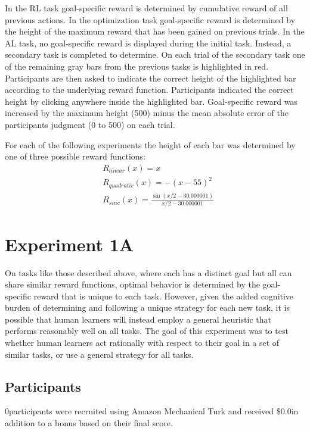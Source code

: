 \documentclass[10pt,letterpaper]{article}
\def\maxheight{500}
\def\basepay{\$0.0}
\def\numpartA{0}
\begin{document}
	In the RL task goal-specific reward is determined by cumulative reward of all previous actions. In the optimization task goal-specific reward is determined by the height of the maximum reward that has been gained on previous trials. In the AL task, no goal-specific reward is displayed during the initial task. Instead, a secondary task is completed to determine. On each trial of the secondary task one of the remaining gray bars from the previous tasks is highlighted in red. Participants are then asked to indicate the correct height of the highlighted bar according to the underlying reward function. Participants indicated the correct height by clicking anywhere inside the highlighted bar. Goal-specific reward was increased by the maximum height (\maxheight) minus the mean absolute error of the participants judgment (0 to \maxheight) on each trial.
	
	For each of the following experiments the height of each bar was determined by one of three possible reward functions:
	\begin{equation*}
	\begin{split}
	&R_{linear}(x) = x \\
	&R_{quadratic}(x) = -(x-55)^{2} \\
	&R_{sinc}(x) = \frac{\sin(x/2-30.000001)}{x/2-30.000001}
	\end{split}
	\end{equation*}
	
	\section{Experiment 1A}
	
	On tasks like those described above, where each has a distinct goal but all can share similar reward functions, optimal behavior is determined by the goal-specific reward that is unique to each task. However, given the added cognitive burden of determining and following a unique strategy for each new task, it is possible that human learners will instead employ a general heuristic that performs reasonably well on all tasks. The goal of this experiment was to test whether human learners act rationally with respect to their goal in a set of similar tasks, or use a general strategy for all tasks.
	
	\subsection{Participants}
	
	\numpartA \space participants were recruited using Amazon Mechanical Turk and received \basepay \space in addition to a bonus based on their final score.
	
\end{document}
